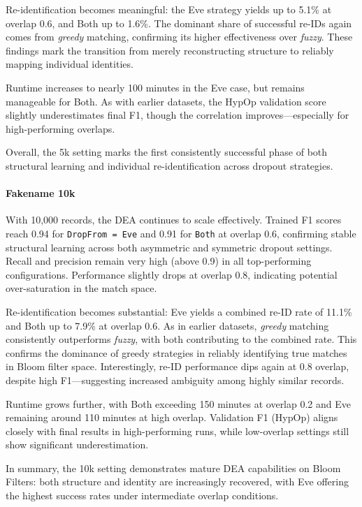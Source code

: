 Re-identification becomes meaningful: the Eve strategy yields up to 5.1\% at overlap 0.6, and Both up to 1.6\%.
The dominant share of successful re-IDs again comes from \emph{greedy} matching, confirming its higher effectiveness over \emph{fuzzy}.
These findings mark the transition from merely reconstructing structure to reliably mapping individual identities.

Runtime increases to nearly 100 minutes in the Eve case, but remains manageable for Both.
As with earlier datasets, the HypOp validation score slightly underestimates final F1, though the correlation improves—especially for high-performing overlaps.

Overall, the 5k setting marks the first consistently successful phase of both structural learning and individual re-identification across dropout strategies.


\paragraph{Fakename 10k}

With 10{,}000 records, the DEA continues to scale effectively.
Trained F1 scores reach 0.94 for \texttt{DropFrom = Eve} and 0.91 for \texttt{Both} at overlap 0.6, confirming stable structural learning across both asymmetric and symmetric dropout settings.
Recall and precision remain very high (above 0.9) in all top-performing configurations.
Performance slightly drops at overlap 0.8, indicating potential over-saturation in the match space.

Re-identification becomes substantial: Eve yields a combined re-ID rate of 11.1\% and Both up to 7.9\% at overlap 0.6.
As in earlier datasets, \emph{greedy} matching consistently outperforms \emph{fuzzy}, with both contributing to the combined rate.
This confirms the dominance of greedy strategies in reliably identifying true matches in Bloom filter space.
Interestingly, re-ID performance dips again at 0.8 overlap, despite high F1—suggesting increased ambiguity among highly similar records.

Runtime grows further, with Both exceeding 150 minutes at overlap 0.2 and Eve remaining around 110 minutes at high overlap.
Validation F1 (HypOp) aligns closely with final results in high-performing runs, while low-overlap settings still show significant underestimation.

In summary, the 10k setting demonstrates mature DEA capabilities on Bloom Filters: both structure and identity are increasingly recovered, with Eve offering the highest success rates under intermediate overlap conditions.

